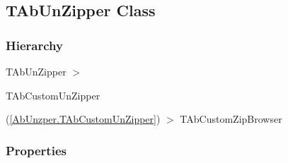 \documentclass{report}
\begin{document}
\subsection*{TAbUnZipper Class}
\fi
\label{AbUnzper.TAbUnZipper}
\subsubsection*{\large{\textbf{Hierarchy}}\normalsize\hspace{1ex}\hfill}
TAbUnZipper {$>$} \begin{ttfamily}TAbCustomUnZipper\end{ttfamily}(\ref{AbUnzper.TAbCustomUnZipper}) {$>$} 
TAbCustomZipBrowser
\subsubsection*{\large{\textbf{Properties}}\normalsize\hspace{1ex}\hfill}
\end{document}
